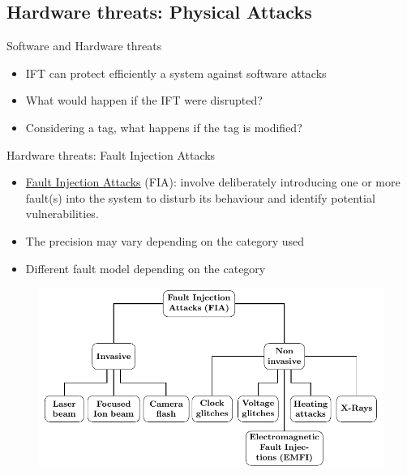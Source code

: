 \subsection{Hardware threats: Physical Attacks}
\begin{frame}{Software and Hardware threats}
    \begin{block}{}
        \begin{itemize}
            [square]
            \justifying
            \item IFT can protect efficiently a system against software attacks
            \item What would happen if the IFT were disrupted?
            \item Considering a tag, what happens if the tag is modified?
        \end{itemize}
    \end{block}
\end{frame}

\begin{frame}{Hardware threats: Fault Injection Attacks}
    \begin{block}{}
        \begin{itemize}
            [square]
            \justifying
            \item \underline{Fault Injection Attacks} (FIA): involve deliberately introducing one or more fault(s) into the system to disturb its behaviour and identify potential vulnerabilities.
            \item The precision may vary depending on the category used
            \item Different fault model depending on the category
        \end{itemize}
    \end{block}
    
    \begin{figure}
        \centering
        \includegraphics[height=.5\textheight, page=2]{src/1_introduction/img/physicalAttacks.pdf}
        \label{fig:fia}
    \end{figure}
\end{frame}
